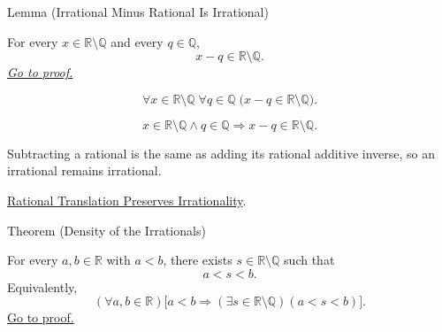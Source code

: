 \begin{lemmabox}{Lemma (Irrational Minus Rational Is Irrational)}
\begin{lemma}
\label{lem:irrational-minus-rational-is-irrational}
For every $x\in\mathbb{R}\setminus\mathbb{Q}$ and every $q\in\mathbb{Q}$,
\[
  x-q\in\mathbb{R}\setminus\mathbb{Q}.
\]
\hyperref[prf:irrational-minus-rational-is-irrational]{\textit{Go to proof.}}
\end{lemma}
\end{lemmabox}

\begin{remark*}
\[
\forall x\in\mathbb{R}\setminus\mathbb{Q}\;\forall q\in\mathbb{Q}\;
\bigl(x-q\in\mathbb{R}\setminus\mathbb{Q}\bigr).
\]
\end{remark*}

\begin{remark*}
\[
x\in\mathbb{R}\setminus\mathbb{Q}\land q\in\mathbb{Q}
\Longrightarrow x-q\in\mathbb{R}\setminus\mathbb{Q}.
\]
\end{remark*}

\begin{remark*}[Interpretation]
Subtracting a rational is the same as adding its rational additive inverse, so
an irrational remains irrational.
\end{remark*}

\begin{dependencies}
\hyperref[lem:rational-translation-preserves-irrationality]{Rational Translation Preserves Irrationality}.
\end{dependencies}










\begin{theorembox}{Theorem (Density of the Irrationals)}
\begin{theorem}
\label{thm:density-of-irrationals-in-reals}
For every $a,b\in\mathbb{R}$ with $a<b$, there exists
$s\in\mathbb{R}\setminus\mathbb{Q}$ such that
\[
  a<s<b.
\]
Equivalently,
\[
  (\forall a,b\in\mathbb{R})
  \bigl[a<b\Longrightarrow
  (\exists s\in\mathbb{R}\setminus\mathbb{Q})(a<s<b)\bigr].
\]
\hyperref[prf:density-of-irrationals-in-reals]{Go to proof.}
\end{theorem}
\end{theorembox}

